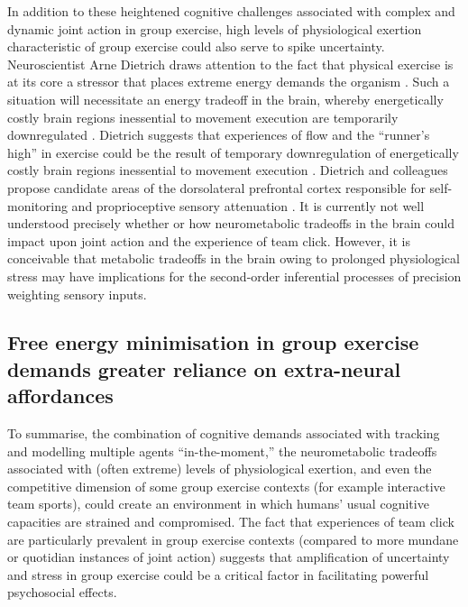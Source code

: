 \begin{CJK}{UTF8}{gbsn}
    In addition to these heightened cognitive challenges associated with complex and dynamic joint action in group exercise, high levels of physiological exertion characteristic of group exercise could also serve to spike uncertainty.  Neuroscientist Arne Dietrich draws attention to the fact that physical exercise is at its core a stressor that places extreme energy demands the organism \citep{Dietrich2011}.
    Such a situation will necessitate an energy tradeoff in the brain, whereby energetically costly brain regions inessential to movement execution are temporarily downregulated \citep{Dietrich2004b}.  Dietrich suggests that experiences of flow and the ``runner's high'' in exercise could be the result of temporary downregulation of energetically costly brain regions inessential to movement execution  \citep{Dietrich2004b}.  Dietrich and colleagues propose candidate areas of the dorsolateral prefrontal cortex responsible for self-monitoring and proprioceptive sensory attenuation \citep[commonly known as the ``inner critic'' regions of the brain, see][]{Limb2008}.  It is currently not well understood precisely whether or how neurometabolic tradeoffs in the brain could impact upon joint action and the experience of team click.  However, it is conceivable that metabolic tradeoffs in the brain owing to prolonged physiological stress may have implications for the second-order inferential processes of precision weighting sensory inputs.


    \subsection{Free energy minimisation in group exercise demands greater reliance on extra-neural affordances \label{sect:extraNeural}}
    To summarise, the combination of cognitive demands associated with tracking and modelling multiple agents ``in-the-moment,'' the neurometabolic tradeoffs associated with (often extreme) levels of physiological exertion, and even the competitive dimension of some group exercise contexts (for example interactive team sports), could create an environment in which humans' usual cognitive capacities are strained and compromised.  The fact that experiences of team click are particularly prevalent in group exercise contexts (compared to more mundane or quotidian instances of joint action) suggests that amplification of uncertainty and stress in group exercise could be a critical factor in facilitating powerful psychosocial effects.


\end{CJK}

